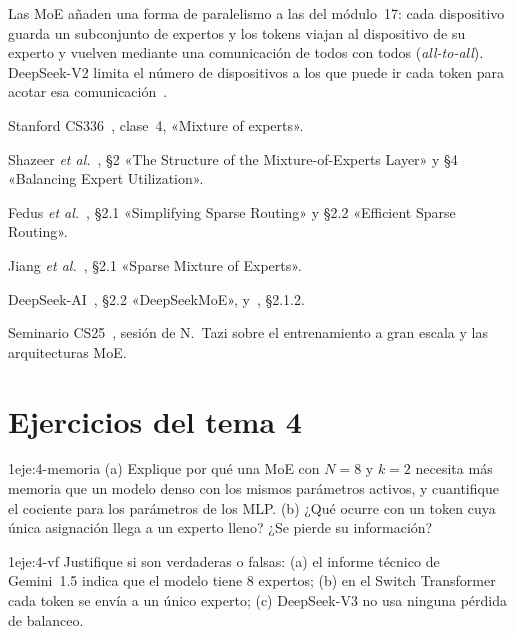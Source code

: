\begin{observacion}
Las MoE añaden una forma de paralelismo a las del módulo~17: cada dispositivo guarda un subconjunto de expertos y los tokens viajan al dispositivo de su experto y vuelven mediante una comunicación de todos con todos (\emph{all-to-all}). DeepSeek-V2 limita el número de dispositivos a los que puede ir cada token para acotar esa comunicación~\cite[§2.2.2]{deepseekv2}.
\end{observacion}

\begin{lecturas}
\item Stanford CS336~\cite{cs336}, clase~4, «Mixture of experts».
\item Shazeer \emph{et al.}~\cite{shazeer2017}, §2 «The Structure of the Mixture-of-Experts Layer» y §4 «Balancing Expert Utilization».
\item Fedus \emph{et al.}~\cite{switch}, §2.1 «Simplifying Sparse Routing» y §2.2 «Efficient Sparse Routing».
\item Jiang \emph{et al.}~\cite{mixtral}, §2.1 «Sparse Mixture of Experts».
\item DeepSeek-AI~\cite{deepseekv2}, §2.2 «DeepSeekMoE», y~\cite{deepseekv3}, §2.1.2.
\item Seminario CS25~\cite{cs25}, sesión de N.~Tazi sobre el entrenamiento a gran escala y las arquitecturas MoE.
\end{lecturas}

\section*{Ejercicios del tema 4}

\begin{ejercicio}{1}{eje:4-memoria}
(a) Explique por qué una MoE con $N=8$ y $k=2$ necesita más memoria que un modelo denso con los mismos parámetros activos, y cuantifique el cociente para los parámetros de los MLP. (b) ¿Qué ocurre con un token cuya única asignación llega a un experto lleno? ¿Se pierde su información?
\end{ejercicio}

\begin{ejercicio}{1}{eje:4-vf}
Justifique si son verdaderas o falsas: (a) el informe técnico de Gemini~1.5 indica que el modelo tiene 8 expertos; (b) en el Switch Transformer cada token se envía a un único experto; (c) DeepSeek-V3 no usa ninguna pérdida de balanceo.
\end{ejercicio}

